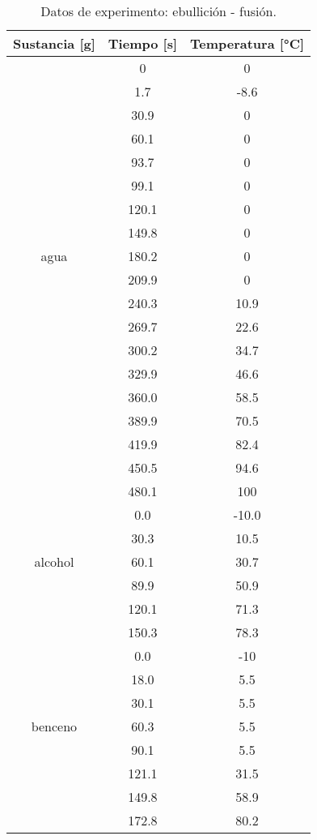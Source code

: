 \documentclass[a4paper, 12p]{article}
\begin{document}
\begin{table}[H]
      \centering
      \begin{tabular}{|c|c|c|}\hline
            Sustancia [g]& Tiempo [s] & Temperatura [°C]\\ \hline
                          &    0     &  0\\
                          &     1.7  & -8.6\\
                          &   30.9   & 0\\
                          &   60.1   & 0\\
                          &   93.7   & 0\\
                          &   99.1   & 0\\
                          &   120.1  & 0\\
                          &   149.8  & 0\\
             agua         &   180.2  & 0\\
                          &   209.9  & 0\\
                          &   240.3  & 10.9\\
                          &   269.7  & 22.6\\
                          &   300.2  & 34.7\\
                          &   329.9  & 46.6\\
                          &   360.0  & 58.5\\
                          &   389.9  & 70.5\\
                          &   419.9  & 82.4\\
                          &   450.5  & 94.6\\
                          &   480.1  & 100\\ \hline
                          &0.0       &-10.0\\
                          &30.3      &10.5\\
           alcohol        &60.1      &30.7\\
                          &89.9      &50.9\\
                          &120.1     &71.3\\
                          &150.3     &78.3\\ \hline
                          &0.0      &-10\\
                          &18.0     &5.5\\
                          &30.1     &5.5\\
           benceno        &60.3     &5.5\\
                          &90.1     &5.5\\
                          &121.1    &31.5\\
                          &149.8    &58.9\\
                          &172.8    &80.2\\ \hline
      \end{tabular}
      \label{tab: fusion-ebullicion}
      \caption{Datos de experimento:  ebullición - fusión.} 
\end{table}
\end{document}
